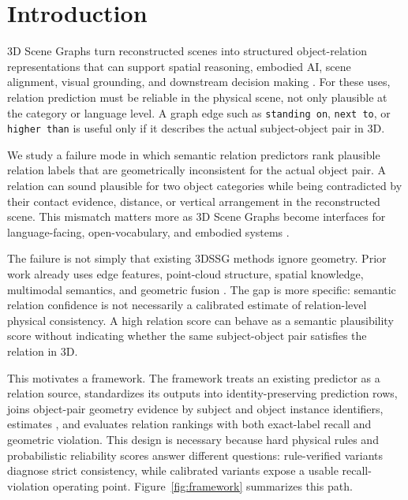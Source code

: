 \section{Introduction}

3D Scene Graphs turn reconstructed scenes into structured object-relation
representations that can support spatial reasoning, embodied AI, scene
alignment, visual grounding, and downstream decision making
\cite{wald2020learning3dssg,sarkar2023sgaligner,xie2024sgpgm,liu2026viewongraph}.
For these uses, relation prediction must be reliable in the physical scene, not
only plausible at the category or language level. A graph edge such as
\texttt{standing on}, \texttt{next to}, or \texttt{higher than} is useful only
if it describes the actual subject-object pair in 3D.

We study a failure mode in which semantic relation predictors rank plausible
relation labels that are geometrically inconsistent for the actual object pair.
A relation can sound plausible for two object categories while being
contradicted by their contact evidence, distance, or vertical arrangement in
the reconstructed scene. This mismatch matters more as 3D Scene Graphs become
interfaces for language-facing, open-vocabulary, and embodied systems
\cite{koch2024open3dsg,hou2025fross,zhang2025openfungraph,wang2025octreegraph,saxena2025zing3d,yu2025openworld3dsg,madhavaram2026vizor}.

The failure is not simply that existing 3DSSG methods ignore geometry. Prior
work already uses edge features, point-cloud structure, spatial knowledge,
multimodal semantics, and geometric fusion
\cite{zhang2021sggpoint,feng2023smka,wang2023vlsat,koch2024sgrec3d,chen2024ccl3dsgg}.
The gap is more specific: semantic relation confidence is not necessarily a
calibrated estimate of relation-level physical consistency. A high relation
score can behave as a semantic plausibility score without indicating whether
the same subject-object pair satisfies the relation in 3D.

This motivates a \method{} framework. The framework treats an existing
predictor as a relation source, standardizes its outputs into
identity-preserving prediction rows, joins object-pair geometry evidence by
subject and object instance identifiers, estimates \pgeom{}, and evaluates
relation rankings with both exact-label recall and geometric violation. This
design is necessary because hard physical rules and probabilistic reliability
scores answer different questions: rule-verified variants diagnose strict
consistency, while calibrated variants expose a usable recall-violation
operating point. Figure~\ref{fig:framework} summarizes this path.

